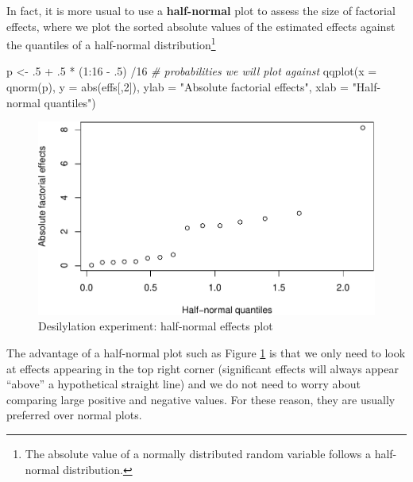 \documentclass[
]{book}
\newenvironment{Shaded}{\begin{snugshade}}{\end{snugshade}}
\newcommand{\AttributeTok}[1]{\textcolor[rgb]{0.77,0.63,0.00}{#1}}
\newcommand{\CommentTok}[1]{\textcolor[rgb]{0.56,0.35,0.01}{\textit{#1}}}
\newcommand{\DecValTok}[1]{\textcolor[rgb]{0.00,0.00,0.81}{#1}}
\newcommand{\FunctionTok}[1]{\textcolor[rgb]{0.00,0.00,0.00}{#1}}
\newcommand{\NormalTok}[1]{#1}
\newcommand{\OtherTok}[1]{\textcolor[rgb]{0.56,0.35,0.01}{#1}}
\newcommand{\SpecialCharTok}[1]{\textcolor[rgb]{0.00,0.00,0.00}{#1}}
\newcommand{\StringTok}[1]{\textcolor[rgb]{0.31,0.60,0.02}{#1}}
\theoremstyle{definition}
\theoremstyle{definition}
\theoremstyle{definition}
\theoremstyle{definition}
\theoremstyle{remark}
\begin{document}
In fact, it is more usual to use a \textbf{half-normal} plot to assess the size of factorial effects, where we plot the sorted absolute values of the estimated effects against the quantiles of a half-normal distribution\footnote{The absolute value of a normally distributed random variable follows a half-normal distribution.}

\begin{Shaded}
\begin{Highlighting}[]
\NormalTok{p }\OtherTok{\textless{}{-}}\NormalTok{ .}\DecValTok{5} \SpecialCharTok{+}\NormalTok{ .}\DecValTok{5} \SpecialCharTok{*}\NormalTok{ (}\DecValTok{1}\SpecialCharTok{:}\DecValTok{16} \SpecialCharTok{{-}}\NormalTok{ .}\DecValTok{5}\NormalTok{) }\SpecialCharTok{/}\DecValTok{16} \CommentTok{\# probabilities we will plot against}
\FunctionTok{qqplot}\NormalTok{(}\AttributeTok{x =} \FunctionTok{qnorm}\NormalTok{(p), }\AttributeTok{y =} \FunctionTok{abs}\NormalTok{(effs[,}\DecValTok{2}\NormalTok{]), }\AttributeTok{ylab =} \StringTok{"Absolute factorial effects"}\NormalTok{, }
       \AttributeTok{xlab =} \StringTok{"Half{-}normal quantiles"}\NormalTok{)}
\end{Highlighting}
\end{Shaded}

\begin{figure}

{\centering \includegraphics{bookdown_math3014-6027_files/figure-latex/desilylation-half-normal-plot-1} 

}

\caption{Desilylation experiment: half-normal effects plot}\label{fig:desilylation-half-normal-plot}
\end{figure}

The advantage of a half-normal plot such as Figure \ref{fig:desilylation-half-normal-plot} is that we only need to look at effects appearing in the top right corner (significant effects will always appear ``above'' a hypothetical straight line) and we do not need to worry about comparing large positive and negative values. For these reason, they are usually preferred over normal plots.
\end{document}
